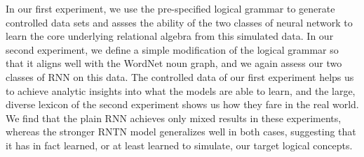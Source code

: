 In our first experiment, we use the pre-specified logical grammar to
generate controlled data sets and assses the ability of the two
classes of neural network to learn the core underlying relational
algebra from this simulated data. In our second experiment, we define
a simple modification of the logical grammar so that it aligns well
with the WordNet noun graph, and we again assess our two classes of
RNN on this data. The controlled data of our first experiment helps us
to achieve analytic insights into what the models are able to learn,
and the large, diverse lexicon of the second experiment shows us how
they fare in the real world. We find that the plain RNN achieves only
mixed results in these experiments, whereas the stronger RNTN model
generalizes well in both cases, suggesting that it has in fact
learned, or at least learned to simulate, our target logical concepts.

